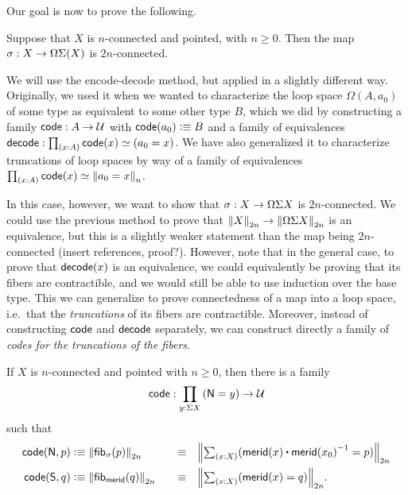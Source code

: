Our goal is now to prove the following.

\begin{thm}\label{thm:freudenthal}
  Suppose that $X$ is $n$-connected and pointed, with $n\geq 0$.
  Then the map $\sigma:X\to \Omega\susp(X)$ is $2n$-connected.
\end{thm}

We will use the encode-decode method, but applied in a slightly different way.
Originally, we used it when we wanted to characterize the loop space $\Omega (A,a_0)$ of some type as equivalent to some other type $B$, which we did by constructing a family $\code:A\to \type$ with $\code(a_0)\defeq B$ and a family of equivalences $\decode:\prd{x:A}\code(x) \simeq (a_0=x)$.
We have also generalized it to characterize truncations of loop spaces by way of a family of equivalences $\prd{x:A}\code(x) \simeq \trunc n{a_0=x}$.

In this case, however, we want to show that $\sigma:X\to \Omega \susp X$ is $2n$-connected.
We could use the previous method to prove that $\trunc{2n}X\to \trunc{2n}{\Omega \susp X}$ is an equivalence, but this is a slightly weaker statement than the map being $2n$-connected (insert references, proof?).
However, note that in the general case, to prove that $\decode(x)$ is an equivalence, we could equivalently be proving that its fibers are contractible, and we would still be able to use induction over the base type.
This we can generalize to prove connectedness of a map into a loop space, i.e.\ that the \emph{truncations} of its fibers are contractible.
Moreover, instead of constructing $\code$ and $\decode$ separately, we can construct directly a family of \emph{codes for the truncations of the fibers}.

\begin{lem}\label{thm:freudcode}
  If $X$ is $n$-connected and pointed with $n\geq 0$, then there is a family
  \begin{equation}
    \code:\prd{y:\susp X} (\north=y) \to \type\label{eq:freudcode}
  \end{equation}
  such that
  \begin{alignat}{2}
    \code(\north,p) &\defeq \trunc{2n}{\hfib{\sigma}{p}}
    &\quad\jdeq\quad & \trunc{2n}{\tsm{x:X} (\merid(x) \ct \opp{\merid(x_0)} = p)}\label{eq:freudcodeN}\\
    \code(\south,q) &\defeq \trunc{2n}{\hfib{\merid}{q}}
    &\quad\jdeq\quad & \trunc{2n}{\tsm{x:X} (\merid(x) = q)}.\label{eq:freudcodeS}
  \end{alignat}
\end{lem}

